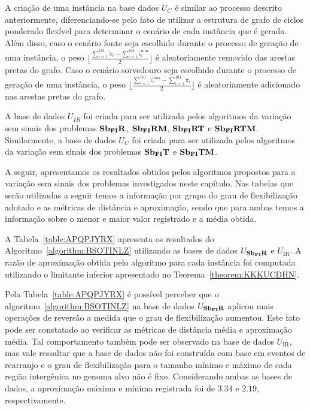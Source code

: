 A criação de uma instância na base dados $U_{C}$ é similar ao processo descrito anteriormente, diferenciando-se pelo fato de utilizar a estrutura de grafo de ciclos ponderado flexível para determinar o cenário de cada instância que é gerada. Além disso, caso o cenário fonte seja escolhido durante o processo de geração de uma instância, o peso $\lfloor\frac{\sum_{i = 1}^{101}\breve\pi_i - \sum_{i = 1}^{101}\breve\iota^{\min}_i}{2}\rfloor$ é aleatoriamente removido das arestas pretas do grafo. Caso o cenário sorvedouro seja escolhido durante o processo de geração de uma instância, o peso $\lfloor\frac{\sum_{i = 1}^{101}\breve\iota^{\max}_i - \sum_{i = 1}^{101}\breve\pi_i}{2}\rfloor$ é aleatoriamente adicionado nas arestas pretas do grafo. 

A base de dados $U_{IR}$ foi criada para ser utilizada pelos algoritmos da variação sem sinais dos problemas $\textbf{Sb\textsubscript{FI}R}{}$, $\textbf{Sb\textsubscript{FI}RM}{}$, $\textbf{Sb\textsubscript{FI}RT}{}$ e $\textbf{Sb\textsubscript{FI}RTM}{}$. Similarmente, a base de dados $U_{C}$ foi criada para ser utilizada pelos algoritmos da variação sem sinais dos problemas $\textbf{Sb\textsubscript{FI}T}{}$ e $\textbf{Sb\textsubscript{FI}TM}{}$.

A seguir, apresentamos os resultados obtidos pelos algoritmos propostos para a variação sem sinais dos problemas investigados neste capítulo. Nas tabelas que serão utilizadas a seguir temos a informação por grupo do grau de flexibilização adotado e as métricas de distância e aproximação, sendo que para ambas temos a informação sobre o menor e maior valor registrado e a média obtida.

A Tabela~\ref{table:APQPJYRX} apresenta os resultados do Algoritmo~\ref{algorithm:BSOTINLZ} utilizando as bases de dados $U_{\textbf{Sb\textsubscript{FI}R}}{}$ e $U_{\text{IR}}$. A razão de aproximação obtida pelo algoritmo para cada instância foi computada utilizando o limitante inferior apresentado no Teorema~\ref{theorem:KKKUCDHN}.



Pela Tabela~\ref{table:APQPJYRX} é possível perceber que o algoritmo~\ref{algorithm:BSOTINLZ} na base de dados $U_{\textbf{Sb\textsubscript{FI}R}}{}$ aplicou mais operações de reversão a medida que o grau de flexibilização aumentou. Este fato pode ser constatado ao verificar as métricas de distância média e aproximação média. Tal comportamento também pode ser observado na base de dados $U_{\text{IR}}$, mas vale ressaltar que a base de dados não foi construída com base em eventos de rearranjo e o grau de flexibilização para o tamanho mínimo e máximo de cada região intergênica no genoma alvo não é fixo. Considerando ambas as bases de dados, a aproximação máxima e mínima registrada foi de $3.34$ e $2.19$, respectivamente.

